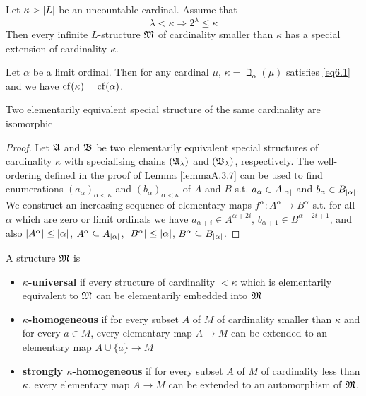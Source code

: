 \documentclass[11pt]{article}
\begin{document}
\begin{corollary}[]
Let \(\kappa>\abs{L}\) be an uncountable cardinal. Assume that
\begin{equation*}
\lambda<\kappa\Rightarrow 2^\lambda\le\kappa\label{eq6.1}
\end{equation*}
Then every infinite \(L\)-structure \(\mathfrak{M}\) of cardinality smaller than \(\kappa\) has a special extension
of cardinality \(\kappa\).
\end{corollary}

Let \(\alpha\) be a limit ordinal. Then for any cardinal \(\mu\), \(\kappa=\beth_\alpha(\mu)\) satisfies \eqref{eq6.1} and we
have \(\operatorname{cf}(\kappa)=\operatorname{cf}(\alpha)\).

\begin{theorem}[]
\label{thm6.1.4}
Two elementarily equivalent special structure of the same cardinality are isomorphic
\end{theorem}

\begin{proof}
\label{Problem8}
Let \(\mathfrak{A}\) and \(\mathfrak{B}\) be two elementarily equivalent special structures of cardinality \(\kappa\) with
specialising chains \((\mathfrak{A}_\lambda)\) and \((\mathfrak{B}_\lambda)\), respectively. The well-ordering defined in the
proof of Lemma \ref{lemmaA.3.7} can be used to find enumerations \((a_\alpha)_{\alpha<\kappa}\)
and \((b_\alpha)_{\alpha<\kappa}\) of \(A\) and \(B\) s.t. \(a_\alpha\in A_{\abs{\alpha}}\) and \(b_\alpha\in B_{\abs{\alpha}}\).
We
construct an increasing sequence of elementary maps \(f^\alpha:A^\alpha\to B^\alpha\) s.t. for all \(\alpha\) which are
zero or limit ordinals we have \(a_{\alpha+i}\in A^{\alpha+2i}\), \(b_{\alpha+1}\in B^{\alpha+2i+1}\), and
also \(\abs{A^\alpha}\le\abs{\alpha}\), \(A^\alpha\subseteq A_{\abs{\alpha}}\), \(\abs{B^\alpha}\le\abs{\alpha}\), \(B^\alpha\subseteq B_{\abs{\alpha}}\).
\end{proof}

\begin{definition}[]
A structure \(\mathfrak{M}\) is
\begin{itemize}
\item \textbf{\(\kappa\)-universal} if every structure of cardinality \(<\kappa\) which is elementarily
equivalent to \(\mathfrak{M}\) can be elementarily embedded into \(\mathfrak{M}\)
\item \textbf{\(\kappa\)-homogeneous} if for every subset \(A\) of \(M\) of cardinality smaller than \(\kappa\)
and for every \(a\in M\), every elementary map \(A\to M\) can be extended to an elementary
map \(A\cup\{a\}\to M\)
\item \textbf{strongly \(\kappa\)-homogeneous} if for every subset \(A\) of \(M\) of cardinality less than \(\kappa\), every
elementary map \(A\to M\) can be extended to an automorphism of \(\mathfrak{M}\).
\end{itemize}
\end{definition}
\end{document}
